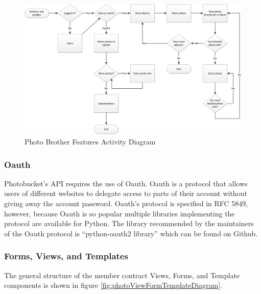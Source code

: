 \documentclass{article}
\begin{document}
\FloatBarrier
\begin{figure}
\centering
\includegraphics[scale=.65]{img/activityDiagrams/photoActivity2}
\caption{Photo Brother Features Activity Diagram}
\label{fig:photoBrotherActivityDiagram}
\end{figure}
\FloatBarrier

\subsubsection{Oauth}

Photobucket's API requires the use of Oauth. Oauth is a protocol that allows users of different websites to delegate access
to parts of their account without giving away the account password. Oauth's protocol is specified in RFC 5849, however, because Oauth is so popular multiple libraries implementing the protocol are available for Python. \cite{eranhueniverse_oauth} The library recommended by the maintainers of the Oauth protocol is ``python-oauth2 library'' which can be found on Github. \cite{oauth_code} \cite{simplego_python-oauth2_2011}

\subsubsection{Forms, Views, and Templates}

The general structure of the member contract Views, Forms, and Template components is shown in figure \ref{fig:photoViewFormTemplateDiagram}.
\end{document}
